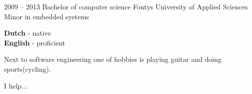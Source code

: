 \documentclass[9pt]{developercv} %
\begin{document}


\begin{entrylist}
	\entry
		{2009 -- 2013}
		{Bachelor of computer science}
        {Fontys University of Applied Sciences}
        {Minor in embedded systems}
\end{entrylist}


\begin{minipage}[t]{0.3\textwidth}
	\vspace{-\baselineskip} %

	\textbf{Dutch} - native\\
	\textbf{English} - proficient\\
\end{minipage}
\hfill
\begin{minipage}[t]{0.3\textwidth}
	\vspace{-\baselineskip} %

	Next to software engineering one of hobbies is playing guitar and doing sports(cycling).
\end{minipage}
\hfill
\begin{minipage}[t]{0.3\textwidth}
	\vspace{-\baselineskip} %
	
	
	I help... \lorem
\end{minipage}

\end{document}
